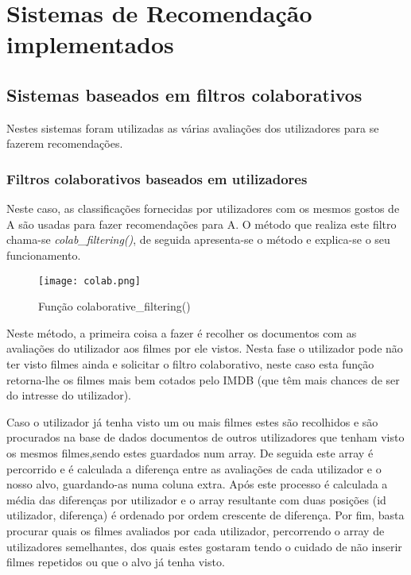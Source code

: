 \section{Sistemas de Recomendação implementados}


\subsection{Sistemas baseados em filtros colaborativos}

Nestes sistemas foram utilizadas as várias avaliações dos utilizadores para se fazerem recomendações. 

\subsubsection{Filtros colaborativos baseados em utilizadores}\hfill

Neste caso, as classificações fornecidas por utilizadores com os mesmos gostos de A são usadas para fazer recomendações para A.
O método que realiza este filtro chama-se \textit{colab\_filtering()}, de seguida apresenta-se o método e explica-se o seu funcionamento.

\begin{figure}[H]
\centering
\texttt{[image: colab.png]}
\caption {Função colaborative\_filtering()}
\label {fig01}
\end{figure}

Neste método, a primeira coisa a fazer é recolher os documentos com as avaliações do utilizador aos filmes por ele vistos. Nesta fase o utilizador pode não ter visto filmes ainda e solicitar o filtro colaborativo, neste caso esta função retorna-lhe os filmes mais bem cotados pelo IMDB (que têm mais chances de ser do intresse do utilizador).
\par Caso o utilizador já tenha visto um ou mais filmes estes são recolhidos e são procurados na base de dados documentos de outros utilizadores que tenham visto os mesmos filmes,sendo estes guardados num array. De seguida este array é percorrido e é calculada a diferença entre as avaliações de cada utilizador e o nosso alvo, guardando-as numa coluna extra.
Após este processo é calculada a média das diferenças por utilizador e o array resultante com duas posições (id utilizador, diferença) é ordenado por ordem crescente de diferença.
Por fim, basta procurar quais os filmes avaliados por cada utilizador, percorrendo o array de utilizadores semelhantes, dos quais estes gostaram tendo o cuidado de não inserir filmes repetidos ou que o alvo já tenha visto.

